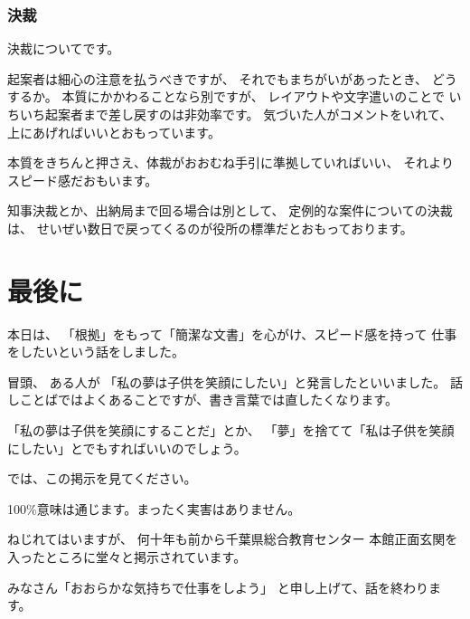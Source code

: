 \documentclass[uplatex,jis2004,dvipdfmx,12pt]{jsarticle}
\begin{document}
\subsubsection{決裁}

決裁についてです。

起案者は細心の注意を払うべきですが、
それでもまちがいがあったとき、
どうするか。
本質にかかわることなら別ですが、
レイアウトや文字遣いのことで
いちいち起案者まで差し戻すのは非効率です。
気づいた人がコメントをいれて、
上にあげればいいとおもっています。

本質をきちんと押さえ、体裁がおおむね手引に準拠していればいい、
それよりスピード感だおもいます。


知事決裁とか、出納局まで回る場合は別として、
定例的な案件についての決裁は、
せいぜい数日で戻ってくるのが役所の標準だとおもっております。



\section{最後に}
本日は、
「根拠」をもって「簡潔な文書」を心がけ、スピード感を持って
仕事をしたいという話をしました。

冒頭、
ある人が
「私の夢は子供を笑顔にしたい」と発言したといいました。
話しことばではよくあることですが、書き言葉では直したくなります。

「私の夢は子供を笑顔にすることだ」とか、
「夢」を捨てて「私は子供を笑顔にしたい」とでもすればいいのでしょう。

では、この掲示を見てください。

100\%意味は通じます。まったく実害はありません。

ねじれてはいますが、
何十年も前から千葉県総合教育センター
本館正面玄関を入ったところに堂々と掲示されています。

みなさん「おおらかな気持ちで仕事をしよう」
と申し上げて、話を終わります。
\end{document}
